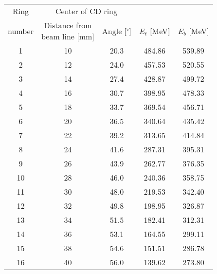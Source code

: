 \begin{tabular}{ccccc}
\hline
Ring   & \multicolumn{2}{c}{Center of CD ring}                            &             &             \\
number & \shortstack{Distance from \\ beam line [mm]}  & Angle [$^\circ$] & $E_t$ [MeV] & $E_b$ [MeV] \\
\hline
1      & 10                                            & 20.3             & 484.86      & 539.89      \\
2      & 12                                            & 24.0             & 457.53      & 520.55      \\
3      & 14                                            & 27.4             & 428.87      & 499.72      \\
4      & 16                                            & 30.7             & 398.95      & 478.33      \\
5      & 18                                            & 33.7             & 369.54      & 456.71      \\
6      & 20                                            & 36.5             & 340.64      & 435.42      \\
7      & 22                                            & 39.2             & 313.65      & 414.84      \\
8      & 24                                            & 41.6             & 287.31      & 395.31      \\
9      & 26                                            & 43.9             & 262.77      & 376.35      \\
10     & 28                                            & 46.0             & 240.36      & 358.75      \\
11     & 30                                            & 48.0             & 219.53      & 342.40      \\
12     & 32                                            & 49.8             & 198.95      & 326.87      \\
13     & 34                                            & 51.5             & 182.41      & 312.31      \\
14     & 36                                            & 53.1             & 164.55      & 299.11      \\
15     & 38                                            & 54.6             & 151.51      & 286.78      \\
16     & 40                                            & 56.0             & 139.62      & 273.80      \\
\hline
\end{tabular}